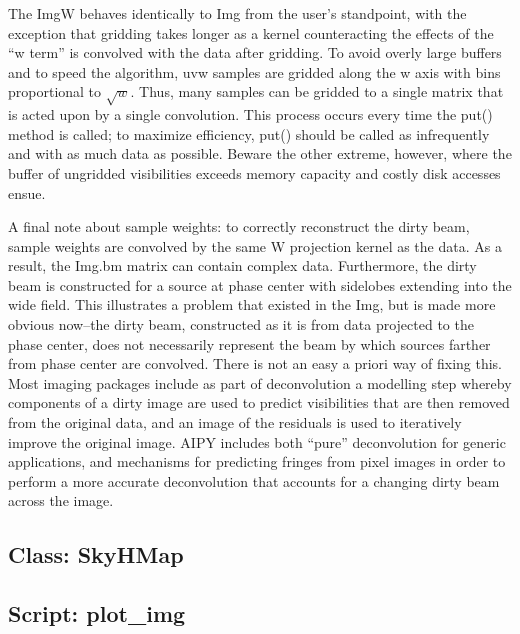 The ImgW behaves identically to Img from the user's standpoint, with the
exception that gridding takes longer as a kernel counteracting the effects
of the ``w term'' is convolved with the data after gridding.  To avoid
overly large buffers and to speed the algorithm, uvw samples are gridded
along the w axis with bins proportional to $\sqrt{w}$.  Thus, many samples
can be gridded to a single matrix that is acted upon by a single convolution.
This process occurs every time the put() method is called; to maximize
efficiency, put() should be called as infrequently and with as much data as 
possible.  Beware the other extreme, however, where the buffer of ungridded
visibilities exceeds memory capacity and costly disk accesses ensue.

A final note about sample weights: to correctly reconstruct the dirty beam,
sample weights are convolved by the same W projection kernel as the data.
As a result, the Img.bm matrix can contain complex data.  Furthermore, the
dirty beam is constructed for a source at phase center with sidelobes
extending into the wide field. This illustrates a problem that existed
in the Img, but is made more obvious now--the dirty beam, constructed as
it is from data projected to the phase center, does not necessarily represent
the beam by which sources farther from phase center are convolved.  There
is not an easy a priori way of fixing this.  Most imaging packages include
as part of deconvolution a modelling step whereby components of a dirty
image are used to predict visibilities that are then removed from the
original data, and an image of the residuals is used to iteratively improve
the original image.  AIPY includes both ``pure'' deconvolution for
generic applications, and mechanisms for predicting fringes from pixel
images in order to perform a more accurate deconvolution that accounts for
a changing dirty beam across the image.

\subsection{Class: SkyHMap}

\subsection{Script: plot\_img}
